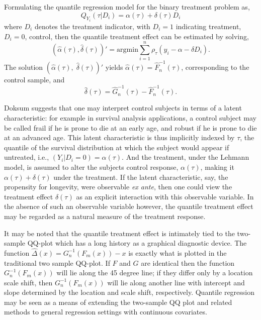 \documentclass{amsart}
\begin{document}
Formulating the quantile regression model
for the binary treatment problem as,
\begin{equation*}\label{eq.qte}
Q_{\scriptscriptstyle Y_i}(\tau|D_i) = \alpha(\tau) + \delta(\tau) D_i
\end{equation*}
where $D_i$ denotes the treatment indicator, with $D_i=1$ indicating
treatment, $D_i=0$, control, then the quantile treatment 
effect can be estimated by solving,
\[
( \hat \alpha(\tau), \hat \delta(\tau) )'
= \mathrm{argmin}
\sum_{i=1}^n \rho_\tau (y_i - \alpha - \delta D_i ).
\]
The solution $(\hat \alpha (\tau),\;
\hat \delta (\tau))'$ yields $\hat \alpha (\tau) = \hat F_n^{-1} (\tau)$,
corresponding to the control sample, and
\[
\hat \delta (\tau) = \hat G_n^{-1} (\tau) -  \hat F_n^{-1} (\tau).
\]

Doksum suggests that one may interpret control subjects in terms of a
latent characteristic:  for example in survival analysis applications,
a control subject may be called frail if he is prone to
die at an early age, and robust if he is prone to die at an
advanced age.  This latent characteristic is thus implicitly indexed by $\tau$,
the quantile of the survival distribution
at which the subject would appear if untreated, i.e.,
$( Y_i | D_i = 0 ) = \alpha(\tau).$
And the treatment, under the Lehmann model,
is assumed to alter the subjects control response, $\alpha(\tau)$, making it
$\alpha(\tau) + \delta(\tau)$ under the treatment.
If the latent characteristic,  say, the propensity for longevity, were
observable {\em ex ante},
then one could view the treatment effect $\delta(\tau)$ as
an explicit interaction with this observable variable.  
In the absence of such an observable variable however, 
the quantile treatment effect
may be regarded as a natural measure of the treatment response.


It may be noted that the quantile treatment effect
is intimately tied to the two-sample
QQ-plot which has a long history as a graphical diagnostic device.
The function $\hat \Delta (x) = G_n^{-1} (F_m (x)) -x$
is exactly what is plotted in the traditional two sample QQ-plot.
If $F$ and $G$ are identical then the function $G_n^{-1} (F_m (x))$
will lie along the 45 degree line;  if they differ only by a location
scale shift, then $G_n^{-1} (F_m (x))$
will lie along another line with intercept and slope determined by
the location and scale shift, respectively.
Quantile regression may be seen
as a means of extending the two-sample QQ plot and related methods
to general regression settings with continuous covariates.
     
\end{document}
